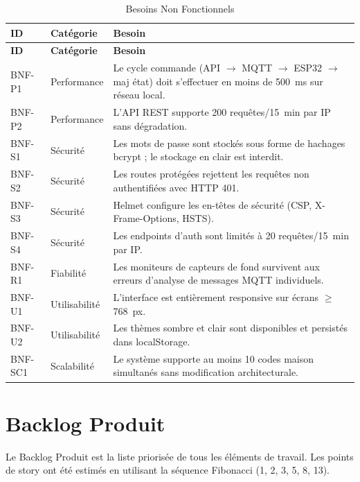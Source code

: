\begin{longtable}{p{} p{} p{}}
\caption{Besoins Non Fonctionnels}\label{tab:bnf}\\
\toprule
\textbf{ID} & \textbf{Catégorie} & \textbf{Besoin} \\
\midrule
\endfirsthead
\toprule
\textbf{ID} & \textbf{Catégorie} & \textbf{Besoin} \\
\midrule
\endhead
\bottomrule
\endfoot
BNF-P1  & Performance     & Le cycle commande (API $\to$ MQTT $\to$ ESP32 $\to$ maj état) doit s'effectuer en moins de 500~ms sur réseau local. \\
BNF-P2  & Performance     & L'API REST supporte 200 requêtes/15~min par IP sans dégradation. \\
BNF-S1  & Sécurité        & Les mots de passe sont stockés sous forme de hachages bcrypt ; le stockage en clair est interdit. \\
BNF-S2  & Sécurité        & Les routes protégées rejettent les requêtes non authentifiées avec HTTP 401. \\
BNF-S3  & Sécurité        & Helmet configure les en-têtes de sécurité (CSP, X-Frame-Options, HSTS). \\
BNF-S4  & Sécurité        & Les endpoints d'auth sont limités à 20 requêtes/15~min par IP. \\
BNF-R1  & Fiabilité       & Les moniteurs de capteurs de fond survivent aux erreurs d'analyse de messages MQTT individuels. \\
BNF-U1  & Utilisabilité   & L'interface est entièrement responsive sur écrans $\geq$768~px. \\
BNF-U2  & Utilisabilité   & Les thèmes sombre et clair sont disponibles et persistés dans localStorage. \\
BNF-SC1 & Scalabilité     & Le système supporte au moins 10 codes maison simultanés sans modification architecturale. \\
\end{longtable}

\section{Backlog Produit}

Le Backlog Produit est la liste priorisée de tous les éléments de travail. Les points
de story ont été estimés en utilisant la séquence Fibonacci (1, 2, 3, 5, 8, 13).

